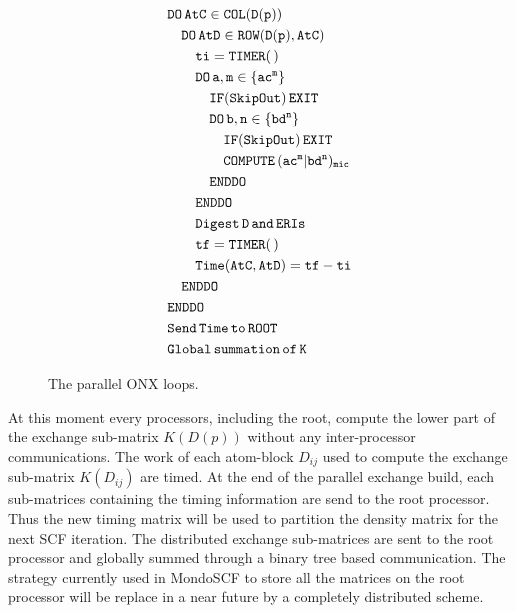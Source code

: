 \documentclass[prl,twocolumn,showpacs,twocolumngrid,superbib]{revtex4}
\begin{document}
\begin{figure}[htbp]
  \centering
  \caption{\protect
    The parallel ONX loops. 
  }\label{Fig:ONXcore}
  \begin{equation*}
    \begin{split}
      &\tt        DO\,AtC\in COL(D(p)) \\
      &\tt\quad     DO\,AtD\in ROW(D(p),AtC) \\
      &\tt\qquad      ti=TIMER(\,) \\
      &\tt\qquad      DO\,a,m\in\{ac^m\} \\
      &\tt\qquad\quad   IF(SkipOut)\,EXIT  \\
      &\tt\qquad\quad   DO\,b,n\in\{bd^n\} \\
      &\tt\qquad\qquad    IF(SkipOut)\,EXIT  \\
      &\tt\qquad\qquad    COMPUTE\,(ac^m|bd^n)_{mic} \\
      &\tt\qquad\quad   ENDDO \\
      &\tt\qquad      ENDDO \\
      &\tt\qquad      Digest\,D\,and\,ERIs \\
      &\tt\qquad      tf=TIMER(\,) \\
      &\tt\qquad      Time(AtC,AtD)=tf-ti \\
      &\tt\quad     ENDDO \\
      &\tt         ENDDO \\
      &\tt         Send\,Time\,to\,ROOT \\
      &\tt         Global\,summation\,of\,K 
    \end{split}
  \end{equation*}
\end{figure}

 At this moment every processors, including the root, compute 
 the lower part of the exchange sub-matrix $K(D(p))$ 
 without any inter-processor communications. 
 The work of each atom-block
 $D_{ij}$ used to compute the exchange 
 sub-matrix $K(D_{ij})$ are timed.
 At the end of the parallel exchange build, each sub-matrices containing 
 the timing information are send to the root processor.
 Thus the new timing matrix will be used to partition the density 
 matrix for the next SCF iteration.
 The distributed exchange sub-matrices are sent to the root processor and globally 
 summed through a binary tree based communication.
 The strategy currently used in MondoSCF to store all the matrices on 
 the root processor will be replace in a near future
 by a completely distributed scheme.
 
\end{document}
